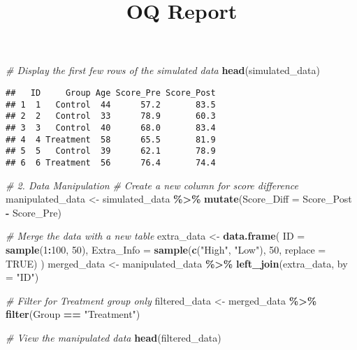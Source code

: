 \documentclass[
]{article}
\title{OQ Report}
\author{}
\date{\vspace{-2.5em}}
\newenvironment{Shaded}{\begin{snugshade}}{\end{snugshade}}
\newcommand{\AttributeTok}[1]{\textcolor[rgb]{0.13,0.29,0.53}{#1}}
\newcommand{\CommentTok}[1]{\textcolor[rgb]{0.56,0.35,0.01}{\textit{#1}}}
\newcommand{\ConstantTok}[1]{\textcolor[rgb]{0.56,0.35,0.01}{#1}}
\newcommand{\DecValTok}[1]{\textcolor[rgb]{0.00,0.00,0.81}{#1}}
\newcommand{\FunctionTok}[1]{\textcolor[rgb]{0.13,0.29,0.53}{\textbf{#1}}}
\newcommand{\NormalTok}[1]{#1}
\newcommand{\OtherTok}[1]{\textcolor[rgb]{0.56,0.35,0.01}{#1}}
\newcommand{\SpecialCharTok}[1]{\textcolor[rgb]{0.81,0.36,0.00}{\textbf{#1}}}
\newcommand{\StringTok}[1]{\textcolor[rgb]{0.31,0.60,0.02}{#1}}
\begin{document}
\maketitle

\begin{Shaded}
\begin{Highlighting}[]
\CommentTok{\# Display the first few rows of the simulated data}
\FunctionTok{head}\NormalTok{(simulated\_data)}
\end{Highlighting}
\end{Shaded}

\begin{verbatim}
##   ID     Group Age Score_Pre Score_Post
## 1  1   Control  44      57.2       83.5
## 2  2   Control  33      78.9       60.3
## 3  3   Control  40      68.0       83.4
## 4  4 Treatment  58      65.5       81.9
## 5  5   Control  39      62.1       78.9
## 6  6 Treatment  56      76.4       74.4
\end{verbatim}

\begin{Shaded}
\begin{Highlighting}[]
\CommentTok{\# 2. Data Manipulation}
\CommentTok{\# Create a new column for score difference}
\NormalTok{manipulated\_data }\OtherTok{\textless{}{-}}\NormalTok{ simulated\_data }\SpecialCharTok{\%\textgreater{}\%}
  \FunctionTok{mutate}\NormalTok{(}\AttributeTok{Score\_Diff =}\NormalTok{ Score\_Post }\SpecialCharTok{{-}}\NormalTok{ Score\_Pre)}

\CommentTok{\# Merge the data with a new table}
\NormalTok{extra\_data }\OtherTok{\textless{}{-}} \FunctionTok{data.frame}\NormalTok{(}
  \AttributeTok{ID =} \FunctionTok{sample}\NormalTok{(}\DecValTok{1}\SpecialCharTok{:}\DecValTok{100}\NormalTok{, }\DecValTok{50}\NormalTok{),}
  \AttributeTok{Extra\_Info =} \FunctionTok{sample}\NormalTok{(}\FunctionTok{c}\NormalTok{(}\StringTok{"High"}\NormalTok{, }\StringTok{"Low"}\NormalTok{), }\DecValTok{50}\NormalTok{, }\AttributeTok{replace =} \ConstantTok{TRUE}\NormalTok{)}
\NormalTok{)}
\NormalTok{merged\_data }\OtherTok{\textless{}{-}}\NormalTok{ manipulated\_data }\SpecialCharTok{\%\textgreater{}\%}
  \FunctionTok{left\_join}\NormalTok{(extra\_data, }\AttributeTok{by =} \StringTok{"ID"}\NormalTok{)}

\CommentTok{\# Filter for Treatment group only}
\NormalTok{filtered\_data }\OtherTok{\textless{}{-}}\NormalTok{ merged\_data }\SpecialCharTok{\%\textgreater{}\%}
  \FunctionTok{filter}\NormalTok{(Group }\SpecialCharTok{==} \StringTok{"Treatment"}\NormalTok{)}

\CommentTok{\# View the manipulated data}
\FunctionTok{head}\NormalTok{(filtered\_data)}
\end{Highlighting}
\end{Shaded}
\end{document}
